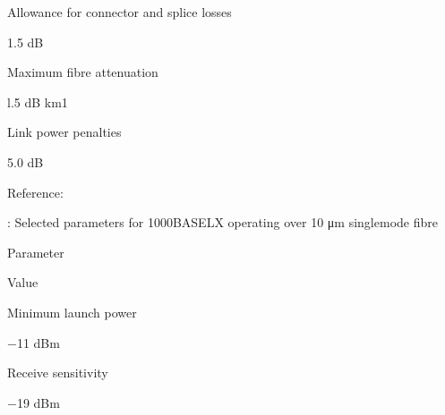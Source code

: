\documentclass[letterpaper,10pt,english]{sphinxmanual}
\begin{document}
Allowance for connector and splice losses





1.5 dB









Maximum fibre attenuation





l.5 dB km1









Link power penalties





5.0 dB







Reference:







: Selected parameters for 1000BASE\sphinxhyphen{}LX operating over 10 μm single\sphinxhyphen{}mode fibre









Parameter





Value









Minimum launch power





−11 dBm









Receive sensitivity





−19 dBm
\end{document}
